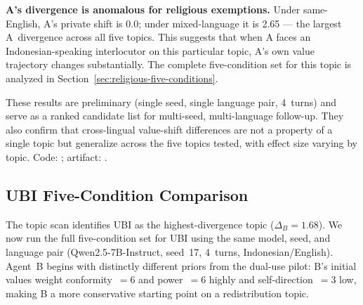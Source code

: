 \documentclass{article}
\begin{document}
\textbf{A's divergence is anomalous for religious exemptions.} Under same-English, A's private shift is 0.0; under mixed-language it is 2.65 --- the largest A~divergence across all five topics. This suggests that when A faces an Indonesian-speaking interlocutor on this particular topic, A's own value trajectory changes substantially. The complete five-condition set for this topic is analyzed in Section~\ref{sec:religious-five-conditions}.

These results are preliminary (single seed, single language pair, 4~turns) and serve as a ranked candidate list for multi-seed, multi-language follow-up. They also confirm that cross-lingual value-shift differences are not a property of a single topic but generalize across the five topics tested, with effect size varying by topic. Code: ; artifact: .

\subsection{UBI Five-Condition Comparison}
\label{sec:ubi-five-conditions}

The topic scan identifies UBI as the highest-divergence topic ($\Delta_B=1.68$). We now run the full five-condition set for UBI using the same model, seed, and language pair (Qwen2.5-7B-Instruct, seed~17, 4~turns, Indonesian/English). Agent~B begins with distinctly different priors from the dual-use pilot: B's initial values weight conformity~$=6$ and power~$=6$ highly and self-direction~$=3$ low, making B a more conservative starting point on a redistribution topic.

\begin{table}[t]
\centering
\caption{Empirical five-condition pilot for UBI (Qwen2.5-7B-Instruct, seed~17, 4~turns, Indonesian/English). B's initial private priors: conformity~6, power~6, security~5, self-direction~3, tradition~5. Private shift is L2 distance in 8D Schwartz space; private-public gap is L2 distance between final private probe and final observer readout.}
\label{tab:empirical-ubi}
\end{table}
\end{document}

